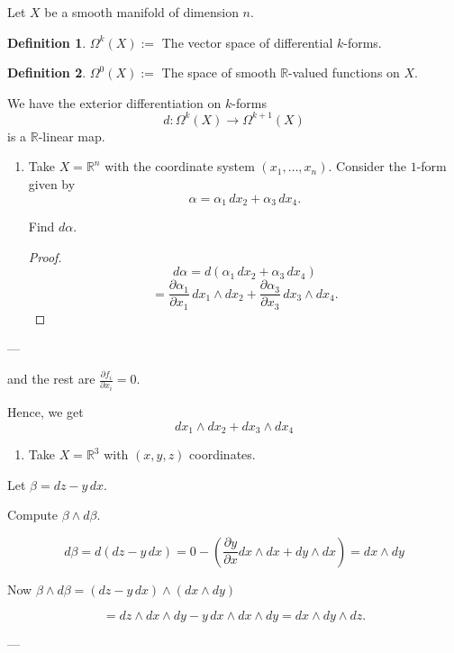 \documentclass[11pt]{article}
\theoremstyle{definition}
\newtheorem{definition}{Definition}[section]
\theoremstyle{remark}
\begin{document}
Let $X$ be a smooth manifold of dimension $n$.

\begin{definition}\label{def:kforms}
$\Omega^k(X) := $ The vector space of differential $k$-forms.
\end{definition}

\begin{definition}\label{def:smoothfunctions}
$\Omega^0(X) := $ The space of smooth $\mathbb{R}$-valued functions on $X$.
\end{definition}

We have the exterior differentiation on $k$-forms
\[ d: \Omega^k(X) \to \Omega^{k+1}(X) \]
is a $\mathbb{R}$-linear map.

\begin{enumerate}
\item Take $X = \mathbb{R}^n$ with the coordinate system $(x_1, \dots, x_n)$. Consider the $1$-form given by
\[ \alpha = \alpha_1 \, dx_2 + \alpha_3 \, dx_4. \]

Find $d\alpha$.

\begin{proof}
\[
d\alpha = d(\alpha_1 \, dx_2 + \alpha_3 \, dx_4)
\]
\[
= \frac{\partial \alpha_1}{\partial x_1} \, dx_1 \wedge dx_2 + \frac{\partial \alpha_3}{\partial x_3} \, dx_3 \wedge dx_4.
\]
\end{proof}
\end{enumerate}

---

and the rest are \(\frac{\partial f_i}{\partial x_i} = 0\).

Hence, we get
\[
d x_1 \wedge d x_2 + d x_3 \wedge d x_4
\]

\begin{enumerate}
\item[(2)] Take \(X = \mathbb{R}^3\) with \((x, y, z)\) coordinates.
\end{enumerate}

Let \(\beta = dz - y \, dx\).

Compute \(\beta \wedge d\beta\).

\[
d\beta = d(dz - y \, dx) = 0 - \left(\frac{\partial y}{\partial x} dx \wedge dx + dy \wedge dx \right) = dx \wedge dy
\]

Now \(\beta \wedge d\beta = (dz - y \, dx) \wedge (dx \wedge dy)\)

\[
= dz \wedge dx \wedge dy - y \, dx \wedge dx \wedge dy = dx \wedge dy \wedge dz.
\]

---
\end{document}
